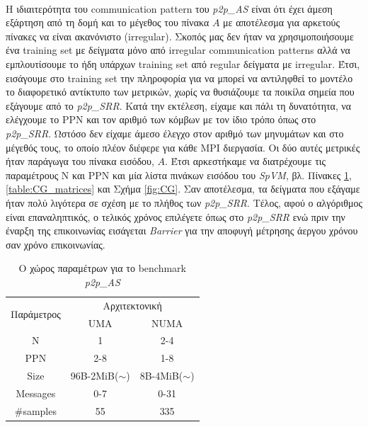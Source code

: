 \paragraph{}
Η ιδιαιτερότητα του communication pattern του \textit{p2p\_AS} είναι ότι έχει άμεση εξάρτηση από τη δομή και το μέγεθος του πίνακα $A$ με αποτέλεσμα για αρκετούς πίνακες να είναι ακανόνιστο (irregular). Σκοπός μας δεν ήταν να χρησιμοποιήσουμε ένα training set με δείγματα μόνο από irregular communication patterns αλλά να εμπλουτίσουμε το ήδη υπάρχων training set από regular δείγματα με irregular. Έτσι, εισάγουμε στο training set την πληροφορία για να μπορεί να αντιληφθεί το μοντέλο το διαφορετικό αντίκτυπο των μετρικών, χωρίς να θυσιάζουμε τα ποικίλα σημεία που εξάγουμε από το \textit{p2p\_SRR}. Κατά την εκτέλεση, είχαμε και πάλι τη δυνατότητα, να ελέγχουμε το PPN και τον αριθμό των κόμβων με τον ίδιο τρόπο όπως στο \textit{p2p\_SRR}. Ωστόσο δεν είχαμε άμεσο έλεγχο στον αριθμό των μηνυμάτων και στο μέγεθός τους, το οποίο πλέον διέφερε για κάθε MPI διεργασία. Οι δύο αυτές μετρικές ήταν παράγωγα του πίνακα εισόδου, $A$. Έτσι αρκεστήκαμε να διατρέχουμε τις παραμέτρους N και PPN και μία λίστα πινάκων εισόδου του \textit{SpVM}, βλ. Πίνακες \ref{table:CG},\ref{table:CG_matrices} και Σχήμα \ref{fig:CG}. Σαν αποτέλεσμα, τα δείγματα που εξάγαμε ήταν πολύ λιγότερα σε σχέση με το πλήθος των \textit{p2p\_SRR}. Τέλος, αφού ο αλγόριθμος είναι επαναληπτικός, ο τελικός χρόνος επιλέγετε όπως στο \textit{p2p\_SRR} ενώ πριν την έναρξη της επικοινωνίας εισάγεται \textit{Barrier} για την αποφυγή μέτρησης άεργου χρόνου σαν χρόνο επικοινωνίας. 

\begin{table}
\centering
\footnotesize
\caption{Ο χώρος παραμέτρων για το benchmark \textit{p2p\_AS}}
\label{table:CG}
\begin{tabular}{c|cc}
\multirow{2}{*}{Παράμετρος} & \multicolumn{2}{c}{Αρχιτεκτονική} \\ 
                            & UMA             & NUMA            \\ \hline \hline
N                           & 1               & 2-4             \\
PPN                         & 2-8             & 1-8             \\
Size                        & 96B-2MiB($\sim$)     & 8B-4MiB($\sim$)        \\
Messages                    & 0-7             & 0-31             \\ \hline
\#samples                   & 55              & 335           
\end{tabular}
\end{table}

